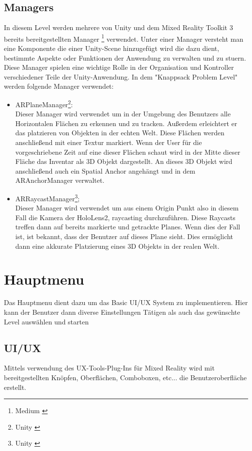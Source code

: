 \subsection{Managers}
In diesem Level werden mehrere von Unity und dem Mixed Reality Toolkit 3 bereits
bereitgestellten Manager \footnote{Medium \cite{Managers}} verwendet. Unter einer Manager
versteht man eine Komponente die einer Unity-Scene hinzugefügt wird die dazu dient,
bestimmte Aspekte oder Funktionen der Anwendung zu verwalten und zu stuern. Diese Manager
spielen eine wichtige Rolle in der Organisation und Kontroller verschiedener Teile der Unity-Anwendung.
In dem "Knappsack Problem Level" werden folgende Manager verwendet:
\begin{itemize}
    \item ARPlaneManager\footnote{Unity \cite{PlaneManager}}:\\
    Dieser Manager wird verwendet um in der Umgebung des Benutzers alle Horizontalen Flächen zu erkennen und zu tracken.
    Außerdem erleichtert er das platzieren von Objekten in der echten Welt.
    Diese Flächen werden anschließend mit einer Textur markiert. Wenn der User für die vorgeschriebene
    Zeit auf eine dieser Flächen schaut wird in der Mitte dieser Fläche das Inventar als 3D Objekt dargestellt. An dieses
    3D Objekt wird anschließend auch ein Spatial Anchor angehängt und in dem ARAnchorManager verwaltet.

    \item ARRaycastManager\footnote{Unity \cite{RaycastManager}}; \\
    Dieser Manager wird verwendet um aus einem Origin Punkt also in diesem Fall die Kamera der HoloLens2, raycasting durchzuführen.
    Diese Raycasts treffen dann auf bereits markierte und getrackte Planes. Wenn dies der Fall ist, ist bekannt, dass der
    Benutzer auf dieses Plane sieht. Dies ermöglicht dann eine akkurate Platzierung eines 3D Objekts in der realen Welt. \\
\end{itemize}

\section{Hauptmenu}
Das Hauptmenu dient dazu um das Basic UI/UX System zu implementieren.
Hier kann der Benutzer dann diverse Einstellungen Tätigen als auch
das gewünschte Level auswählen und starten

\subsection{UI/UX}
Mittels verwendung des UX-Tools-Plug-Ins für Mixed Reality wird
mit bereitgestellten Knöpfen, Oberflächen, Comboboxen, etc...
die Benutzeroberfläche erstellt.

